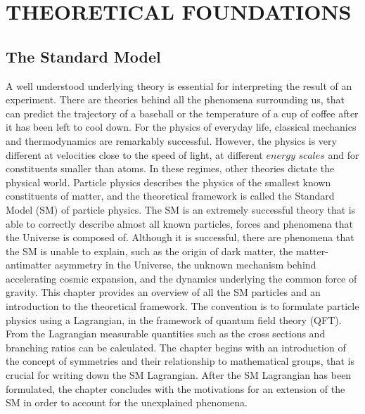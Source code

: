 \part{THEORETICAL FOUNDATIONS}
\noindent\justify
\chapter{The Standard Model} \label{sec:theory}
\noindent\justify
A well understood underlying theory is essential for interpreting the result of an experiment.
There are theories behind all the phenomena surrounding us, that can predict the trajectory of a baseball or the temperature of a cup of coffee after it has been left to cool down. 
For the physics of everyday life, classical mechanics and thermodynamics are remarkably successful. 
However, the physics is very different at velocities close to the speed of light, at different $energy$ $scales$ and for constituents smaller than atoms.
In these regimes, other theories dictate the physical world. 
Particle physics describes the physics of the smallest known constituents of matter, and the theoretical framework is called the Standard Model (SM) of particle physics.
The SM is an extremely successful theory that is able to correctly describe almost all known particles, forces and phenomena that the Universe is composed of. 
Although it is successful, there are phenomena that the SM is unable to explain, such as the origin of dark matter, the matter-antimatter asymmetry in the Universe, the unknown mechanism behind accelerating cosmic expansion, and the dynamics underlying the common force of gravity.
\newpara
\noindent\justify
This chapter provides an overview of all the SM particles and an introduction to the theoretical framework. 
The convention is to formulate particle physics using a Lagrangian, in the framework of quantum field theory (QFT). 
From the Lagrangian measurable quantities such as the cross sections and branching ratios can be calculated. 
The chapter begins with an introduction of the concept of symmetries and their relationship to mathematical groups, that is crucial for writing down the SM Lagrangian.
After the SM Lagrangian has been formulated, the chapter concludes with the motivations for an extension of the SM in order to account for the unexplained phenomena.
\newpage
